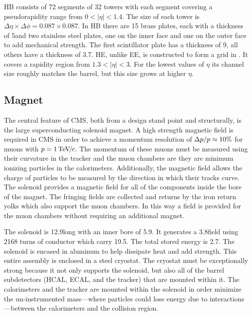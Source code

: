 HB consists of 72 segments of 32 towers with each segment covering a
pseudorapidity range from $0 < |\eta| < 1.4$. The size of each tower is $\Delta
\eta \times \Delta \phi = 0.087 \times 0.087$. In HB there are 15 brass plates,
each with a thickness of 5\centimeters and two stainless steel plates, one on
the inner face and one on the outer face to add mechanical strength. The first
scintillator plate has a thickness of 9\millimeters, all others have a
thickness of 3.7\millimeters. HE, unlike EE, is constructed to form a grid in
\coordetaphi. It covers a rapidity region from $1.3 < |\eta| < 3$. For the
lowest values of $\eta$ its channel size roughly matches the barrel, but this
size grows at higher $\eta$.

\subsection{Magnet}

The central feature of CMS, both from a design stand point and structurally, is
the large superconducting solenoid magnet. A high strength magnetic field is
required in CMS in order to achieve a momentum resolution of $\Delta p
/ p \approx 10\%$ for muons with $p = 1 {\,\text{Te\hspace{-.08em}V\hspace{-0.16em}/\hspace{-0.08em}}c}$. The momentum of
these muons must be measured using their curvature in the tracker and the muon
chambers are they are minimum ionizing particles in the calorimeters.
Additionally, the magnetic field allows the charge of particles to be measured
by the direction in which their tracks curve. The solenoid provides a magnetic
field for all of the components inside the bore of the magnet. The fringing
fields are collected and returns by the iron return yolks which also support
the muon chambers. In this way a field is provided for the muon chambers
without requiring an additional magnet.

The solenoid is 12.9\meters long with an inner bore of 5.9\meters. It generates
a 3.8\tesla field using 2168 turns of conductor which carry 19.5\kiloamps. The
total stored energy is 2.7\gigajoules. The solenoid is encased in aluminum to
help dissipate heat and add strength. This entire assembly is enclosed in a
steel cryostat. The cryostat must be exceptionally strong because it not only
supports the solenoid, but also all of the barrel subdetectors (HCAL, ECAL, and
the tracker) that are mounted within it. The calorimeters and the tracker are
mounted within the solenoid in order minimize the un-instrumented mass---where
particles could lose energy due to interactions---between the calorimeters and
the collision region.
